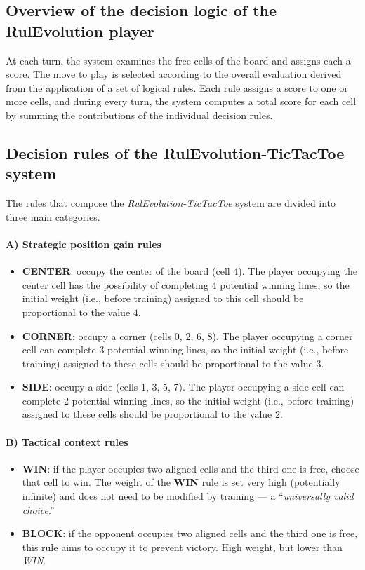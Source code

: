\documentclass[12pt,a4paper]{article}
\begin{document}
\subsection{Overview of the decision logic of the RulEvolution player}

At each turn, the system examines the free cells of the board and assigns each a score.  
The move to play is selected according to the overall evaluation derived from the application of a set of logical rules.  
Each rule assigns a score to one or more cells, and during every turn, the system computes a total score for each cell by summing the contributions of the individual decision rules.

\subsection{Decision rules of the RulEvolution-TicTacToe system}

The rules that compose the \textit{RulEvolution-TicTacToe} system are divided into three main categories.

\paragraph{A) Strategic position gain rules}
\begin{itemize}
    \item \textbf{CENTER}: occupy the center of the board (cell 4).  
    The player occupying the center cell has the possibility of completing 4 potential winning lines, so the initial weight (i.e., before training) assigned to this cell should be proportional to the value $4$.
    \item \textbf{CORNER}: occupy a corner (cells 0, 2, 6, 8).  
    The player occupying a corner cell can complete 3 potential winning lines, so the initial weight (i.e., before training) assigned to these cells should be proportional to the value $3$.
    \item \textbf{SIDE}: occupy a side (cells 1, 3, 5, 7).  
    The player occupying a side cell can complete 2 potential winning lines, so the initial weight (i.e., before training) assigned to these cells should be proportional to the value $2$.
\end{itemize}

\paragraph{B) Tactical context rules}
\begin{itemize}
    \item \textbf{WIN}: if the player occupies two aligned cells and the third one is free, choose that cell to win.  
    The weight of the \textbf{WIN} rule is set very high (potentially infinite) and does not need to be modified by training — a “\textit{universally valid choice}.”
    \item \textbf{BLOCK}: if the opponent occupies two aligned cells and the third one is free, this rule aims to occupy it to prevent victory.  
    High weight, but lower than \textit{WIN}.
\end{itemize}
\end{document}
